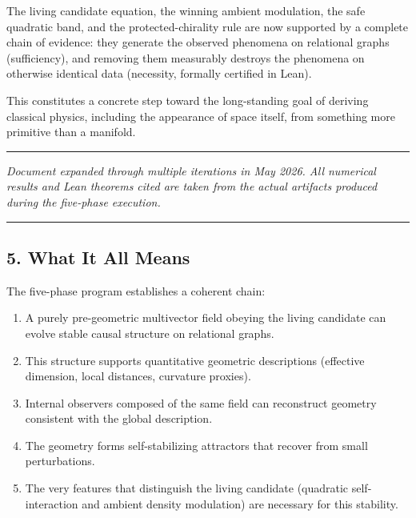 \documentclass[
  11pt,
  a4paper,
]{article}
\providecommand{\tightlist}{%
  \setlength{\itemsep}{0pt}\setlength{\parskip}{0pt}}
\begin{document}
The living candidate equation, the winning ambient modulation, the safe
quadratic band, and the protected-chirality rule are now supported by a
complete chain of evidence: they generate the observed phenomena on
relational graphs (sufficiency), and removing them measurably destroys
the phenomena on otherwise identical data (necessity, formally certified
in Lean).

This constitutes a concrete step toward the long-standing goal of
deriving classical physics, including the appearance of space itself,
from something more primitive than a manifold.

\begin{center}\rule{0.5\linewidth}{0.5pt}\end{center}

\emph{Document expanded through multiple iterations in May 2026. All
numerical results and Lean theorems cited are taken from the actual
artifacts produced during the five-phase execution.}

\begin{center}\rule{0.5\linewidth}{0.5pt}\end{center}

\subsection{5. What It All Means}\label{what-it-all-means}

The five-phase program establishes a coherent chain:

\begin{enumerate}
\def\labelenumi{\arabic{enumi}.}
\tightlist
\item
  A purely pre-geometric multivector field obeying the living candidate
  can evolve stable causal structure on relational graphs.
\item
  This structure supports quantitative geometric descriptions (effective
  dimension, local distances, curvature proxies).
\item
  Internal observers composed of the same field can reconstruct geometry
  consistent with the global description.
\item
  The geometry forms self-stabilizing attractors that recover from small
  perturbations.
\item
  The very features that distinguish the living candidate (quadratic
  self-interaction and ambient density modulation) are necessary for
  this stability.
\end{enumerate}
\end{document}
